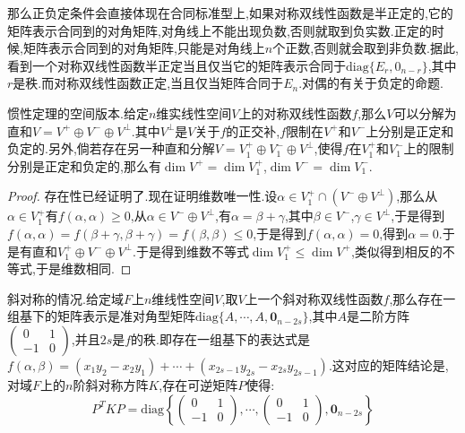 那么正负定条件会直接体现在合同标准型上,如果对称双线性函数是半正定的,它的矩阵表示合同到的对角矩阵,对角线上不能出现负数,否则就取到负实数.正定的时候,矩阵表示合同到的对角矩阵,只能是对角线上$n$个正数,否则就会取到非负数.据此,看到一个对称双线性函数半正定当且仅当它的矩阵表示合同于$\mathrm{diag}\{E_r,0_{n-r}\}$,其中$r$是秩.而对称双线性函数正定,当且仅当矩阵合同于$E_n$.对偶的有关于负定的命题.

惯性定理的空间版本.给定$n$维实线性空间$V$上的对称双线性函数$f$,那么$V$可以分解为直和$V=V^+\oplus V^-\oplus V^{\perp}$.其中$V^{\perp}$是$V$关于$f$的正交补,$f$限制在$V^+$和$V^-$上分别是正定和负定的.另外,倘若存在另一种直和分解$V=V_1^+\oplus V_1^-\oplus V^{\perp}$,使得$f$在$V_1^+$和$V_1^-$上的限制分别是正定和负定的,那么有$\dim V^+=\dim V_1^+$,$\dim V^-=\dim V_1^-$.
\begin{proof}
	
	存在性已经证明了.现在证明维数唯一性.设$\alpha\in V_1^+\cap(V^-\oplus V^{\perp})$,那么从$\alpha\in V_1^+ $有$f(\alpha,\alpha)\ge0$,从$\alpha\in V^-\oplus V^{\perp}$,有$\alpha=\beta+\gamma$,其中$\beta\in V^-$,$\gamma\in V^{\perp}$,于是得到$f(\alpha,\alpha)=f(\beta+\gamma,\beta+\gamma)=f(\beta,\beta)\le0$,于是得到$f(\alpha,\alpha)=0$,得到$\alpha=0$.于是有直和$V_1^+\oplus V^-\oplus V^{\perp}$.于是得到维数不等式$\dim V_1^+\le\dim V^+$,类似得到相反的不等式,于是维数相同.
	
\end{proof}

斜对称的情况.给定域$F$上$n$维线性空间$V$,取$V$上一个斜对称双线性函数$f$,那么存在一组基下的矩阵表示是准对角型矩阵$\mathrm{diag}\{A,\cdots,A,\textbf{0}_{n-2s}\}$,其中$A$是二阶方阵$\left(\begin{array}{cc}
0&1\\
-1&0\end{array}\right)$,并且$2s$是$f$的秩.即存在一组基下的表达式是$f(\alpha,\beta)=(x_1y_2-x_2y_1)+\cdots+(x_{2s-1}y_{2s}-x_{2s}y_{2s-1})$.这对应的矩阵结论是,对域$F$上的$n$阶斜对称方阵$K$,存在可逆矩阵$P$使得:
$$P^TKP=\mathrm{diag}\left\{\left(\begin{array}{cc}
0&1\\
-1&0\end{array}\right),\cdots,\left(\begin{array}{cc}
0&1\\
-1&0\end{array}\right),\textbf{0}_{n-2s}\right\}$$

